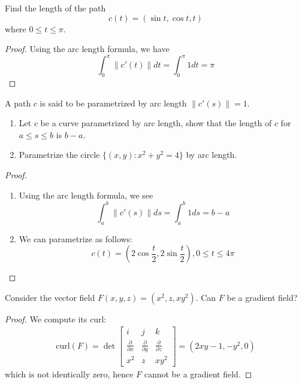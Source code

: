 \documentclass[openany]{book}
\newcommand{\curl}{\text{curl}}
\begin{document}
\begin{prob}
    Find the length of the path 
    \begin{equation*}
        c(t)=(\sin t, \cos t, t)
    \end{equation*}
    where $0\leq t\leq \pi$.
\end{prob}
\begin{proof}
    Using the arc length formula, we have 
    \begin{equation*}
        \int_0^\pi\|c'(t)\|dt=\int_0^\pi 1dt=\pi
    \end{equation*}
\end{proof}


\begin{prob}
    A path $c$ is said to be parametrized by arc length $\|c'(s)\|=1$. 
    \begin{enumerate}
        \item Let $c$ be a curve parametrized by arc length, show that the length of $c$ for $a\leq s\leq b$ is $b-a$.
        \item Parametrize the circle $\{(x,y): x^2+y^2=4\}$ by arc length.
    \end{enumerate}
\end{prob}
\begin{proof}
    \begin{enumerate}
        \item Using the arc length formula, we see
        \begin{equation*}
            \int_a^b\|c'(s)\|ds=\int_a^b1ds=b-a
        \end{equation*}
        \item We can parametrize as follows:
        \begin{equation*}
            c(t)=\left(2\cos\frac{t}{2}, 2\sin\frac{t}{2}\right), 0\leq t\leq 4\pi
        \end{equation*}
    \end{enumerate}
\end{proof}


\begin{prob}
    Consider the vector field $F(x,y,z)=(x^2, z, xy^2)$. Can $F$ be a gradient field?
\end{prob}
\begin{proof}
    We compute its curl:
    \begin{align*}
        \curl(F)=\det\begin{bmatrix}
            i&j&k\\
            \frac{\partial}{\partial x}&\frac{\partial}{\partial y}&\frac{\partial}{\partial z}\\
            x^2&z&xy^2
        \end{bmatrix}=(2xy-1, -y^2, 0)
    \end{align*}
    which is not identically zero, hence $F$ cannot be a gradient field.
\end{proof}
\end{document}
